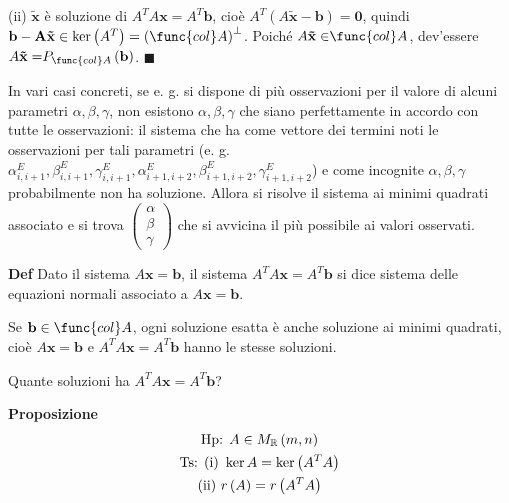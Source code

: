\documentclass{article}
\begin{document}
(ii) $\mathbf{\tilde{x}}$ \`{e} soluzione di $A^{T}A\mathbf{x=}A^{T}\mathbf{b%
}$, cio\`{e} $A^{T}\left( A\mathbf{\tilde{x}-b}\right) =\mathbf{0}$, quindi $%
\mathbf{b-A\mathbf{\tilde{x}}}\in \ker \left( A^{T}\right) =\left( \func{col}%
A\right) ^{\perp }$. Poich\'{e} $A\mathbf{\tilde{x}\in }\func{col}A$,
dev'essere $A\mathbf{\tilde{x}=}P_{\func{col}A}\left( \mathbf{b}\right) $. $%
\blacksquare $

In vari casi concreti, se e. g. si dispone di pi\`{u} osservazioni per il
valore di alcuni parametri $\alpha ,\beta ,\gamma $, non esistono $\alpha
,\beta ,\gamma $ che siano perfettamente in accordo con tutte le
osservazioni: il sistema che ha come vettore dei termini noti le
osservazioni per tali parametri (e. g. $\alpha _{i,i+1}^{E},\beta
_{i,i+1}^{E},\gamma _{i,i+1}^{E},\alpha _{i+1,i+2}^{E},\beta
_{i+1,i+2}^{E},\gamma _{i+1,i+2}^{E}$) e come incognite $\alpha ,\beta
,\gamma $ probabilmente non ha soluzione. Allora si risolve il sistema ai
minimi quadrati associato e si trova $\left( 
\begin{array}{c}
\alpha \\ 
\beta \\ 
\gamma%
\end{array}%
\right) $ che si avvicina il pi\`{u} possibile ai valori osservati.

\textbf{Def} Dato il sistema $A\mathbf{x=b}$, il sistema $A^{T}A\mathbf{x=}%
A^{T}\mathbf{b}$ si dice sistema delle equazioni normali associato a $A%
\mathbf{x=b}$.

Se $\mathbf{b}\in \func{col}A$, ogni soluzione esatta \`{e} anche soluzione
ai minimi quadrati, cio\`{e} $A\mathbf{x=b}$ e $A^{T}A\mathbf{x}=A^{T}%
\mathbf{b}$ hanno le stesse soluzioni.

Quante soluzioni ha $A^{T}A\mathbf{x=}A^{T}\mathbf{b}$?

\textbf{Proposizione}%
\begin{gather*}
\text{Hp}\text{: }A\in M_{%
\mathbb{R}
}\left( m,n\right) \\
\text{Ts}\text{: (i) }\ker A=\ker \left( A^{T}A\right) \\
\text{(ii) }r\left( A\right) =r\left( A^{T}A\right)
\end{gather*}
\end{document}
